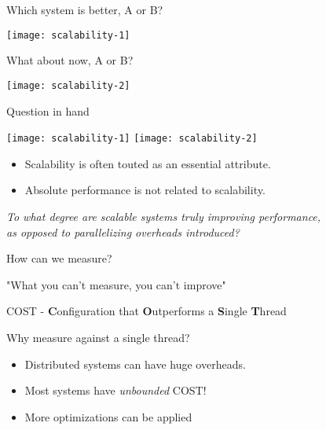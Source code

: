 \begin{frame}[t]{Which system is better, A or B?}
  \begin{center}
    \texttt{[image: scalability-1]}
  \end{center}
\end{frame}

\begin{frame}[t]{What about now, A or B?}
  \begin{center}
    \texttt{[image: scalability-2]}
  \end{center}
\end{frame}

\begin{frame}[t]{Question in hand}
  \begin{center}
    \texttt{[image: scalability-1]}
    \hspace{0.5cm}
    \texttt{[image: scalability-2]}
  \end{center}

  \begin{itemize}
    \item Scalability is often touted as an essential attribute.
    \item Absolute performance is not related to scalability.
  \end{itemize}

  \vspace{0.5cm}
  \pause

  \textit{To what degree are scalable systems truly improving performance, \\ as opposed to parallelizing overheads introduced?}

\end{frame}

\begin{frame}[t]{How can we measure?}
  \begin{center}
    \Large{"What you can't measure, you can't improve"}
  \end{center}
  \vspace{1.5cm}
  \pause
  COST - \textbf{C}onfiguration that \textbf{O}utperforms a \textbf{S}ingle \textbf{T}hread

  \vspace{1.5cm}
  Why measure against a single thread?
  \begin{itemize}
    \item Distributed systems can have huge overheads.
    \item Most systems have \textit{unbounded} COST!
    \item More optimizations can be applied 
  \end{itemize}
\end{frame}